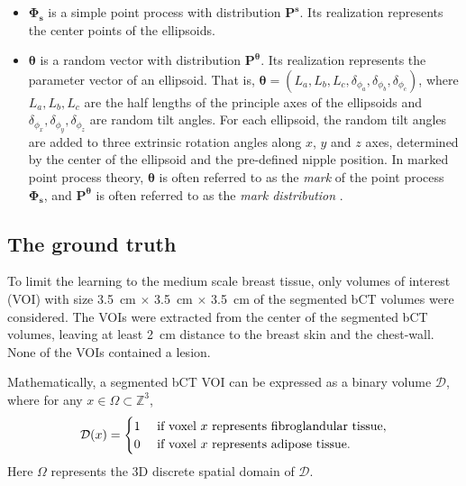 \documentclass[journal]{IEEEtran}
\begin{document}
\begin{itemize}

\item $\mathbf{\Phi_s}$ is a simple point process with distribution
  $\mathbf{P}^{\mathbf{s}}$. Its realization represents the center
  points of the ellipsoids.

\item $\boldsymbol{\theta}$ is a random vector with distribution
  $\mathbf{P}^{\boldsymbol{\theta}}$. Its realization represents the
  parameter vector of an ellipsoid. That is,
  $\boldsymbol{\theta} = \left( L_a, L_b, L_c, \delta_{\phi_a},
    \delta_{\phi_b}, \delta_{\phi_c} \right)$, where $L_a, L_b, L_c$
  are the half lengths of the principle axes of the ellipsoids and
  $\delta_{\phi_{x}},\delta_{\phi_{y}},\delta_{\phi_{z}}$ are random
  tilt angles. For each ellipsoid, the random tilt angles are added to
  three extrinsic rotation angles along $x$, $y$ and $z$ axes,
  determined by the center of the ellipsoid and the pre-defined nipple
  position. In marked point process theory, $\boldsymbol{\theta}$ is
  often referred to as the \textit{mark} of the point process
  $\mathbf{\Phi_s}$, and $\mathbf{P}^{\boldsymbol{\theta}}$ is often
  referred to as the \textit{mark distribution}
  \cite{chiu2013stochastic}.
\end{itemize}

\subsection{The ground truth}
\label{sec:ground-truth}

To limit the learning to the medium scale breast tissue, only volumes
of interest (VOI) with size \SI{3.5}{\cm} $\times$ \SI{3.5}{\cm}
$\times$ \SI{3.5}{\cm} of the segmented bCT volumes were
considered. The VOIs were extracted from the center of the segmented
bCT volumes, leaving at least \SI{2}{\cm} distance to the breast skin
and the chest-wall. None of the VOIs contained a lesion.

Mathematically, a segmented bCT VOI can be expressed as a binary
volume $\mathcal{D}$, where for any
$x \in \Omega \subset \mathbb{Z}^3$,
\begin{equation}
  \label{eq:bct-discrete-form}
  \mathcal{D}(x) =
  \begin{cases}
    1 & \textnormal{ if voxel } x \textnormal{ represents
      fibroglandular tissue}, \\
    0 & \textnormal{ if voxel } x \textnormal{ represents
      adipose tissue}. \\
  \end{cases}
\end{equation}
Here $\Omega$ represents the 3D discrete spatial domain of
$\mathcal{D}$.
\end{document}
